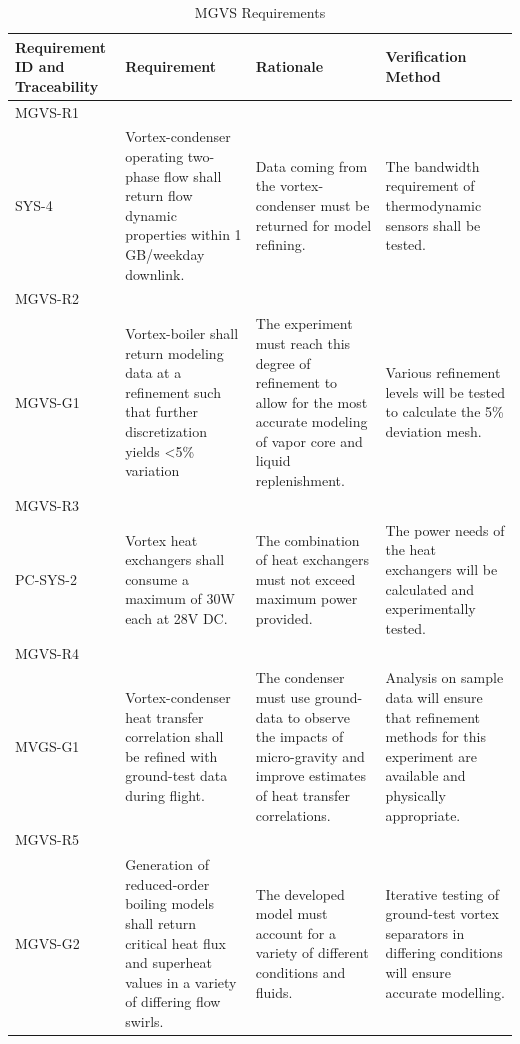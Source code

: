 \documentclass[conf]{new-aiaa}
\begin{document}
\begin{table}[H]
    \centering
    \footnotesize
    \setlength{\tabcolsep}{4pt}
    \renewcommand{\arraystretch}{1.15}
    \begin{tabularx}{\textwidth}{@{}>{\raggedright\arraybackslash}m{2.4cm}YYY@{}}
    \toprule
    \textbf{Requirement ID and Traceability} & \textbf{Requirement} & \textbf{Rationale} & \textbf{Verification Method} \\
    \midrule
    MGVS-R1\\SYS-4 &
    Vortex-condenser operating two-phase flow shall return flow dynamic properties within 1 GB/weekday downlink. &
    Data coming from the vortex-condenser must be returned for model refining. &
    The bandwidth requirement of thermodynamic sensors shall be tested. \\ \hline

    MGVS-R2\\MGVS-G1 &
    Vortex-boiler shall return modeling data at a refinement such that further discretization yields <5\% variation &
    The experiment must reach this degree of refinement to allow for the most accurate modeling of vapor core and liquid replenishment. &
    Various refinement levels will be tested to calculate the 5\% deviation mesh. \\ \hline

    MGVS-R3\\PC-SYS-2 &
    Vortex heat exchangers shall consume a maximum of 30W each at 28V DC. &
    The combination of heat exchangers must not exceed maximum power provided. &
    The power needs of the heat exchangers will be calculated and experimentally tested. \\ \hline

    MGVS-R4\\MVGS-G1 &
    Vortex-condenser heat transfer correlation shall be refined with ground-test data during flight. &
    The condenser must use ground-data to observe the impacts of micro-gravity and improve estimates of heat transfer correlations. &
    Analysis on sample data will ensure that refinement methods for this experiment are available and physically appropriate. \\ \hline

    MGVS-R5\\MGVS-G2 &
    Generation of reduced-order boiling models shall return critical heat flux and superheat values in a variety of differing flow swirls. &
    The developed model must account for a variety of different conditions and fluids. &
    Iterative testing of ground-test vortex separators in differing conditions will ensure accurate modelling. \\
    \bottomrule
    \end{tabularx}
    \caption{MGVS Requirements}
    \label{tab:mgvs_requirements}
\end{table}
\end{document}
